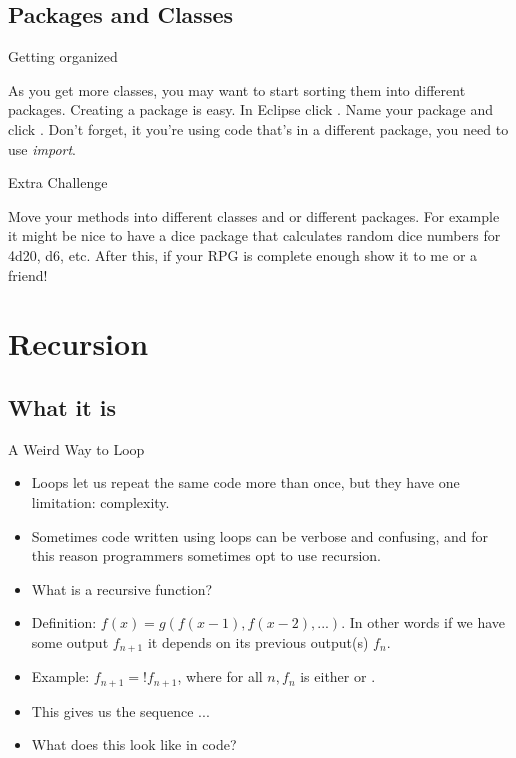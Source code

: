 \subsection{Packages and Classes}
\begin{frame}{Getting organized}
\begin{center}
As you get more classes, you may want to start sorting them into different packages. Creating a package is easy. In Eclipse click . Name your package and click . Don't forget, it you're using code that's in a different package, you need to use \emph{import}.
\end{center}
\end{frame}

\begin{frame}{Extra Challenge}
\begin{center}
Move your methods into different classes and or different packages. For example it might be nice to have a dice package that calculates random dice numbers for 4d20, d6, etc. After this, if your RPG is complete enough show it to me or a friend!
\end{center}
\end{frame}

\section{Recursion}

\subsection{What it is}
\begin{frame}{A Weird Way to Loop}
\begin{itemize}
\item Loops let us repeat the same code more than once, but they have one limitation: complexity. \pause
\item Sometimes code written using loops can be verbose and confusing, and for this reason programmers sometimes opt to use recursion.
\item What is a recursive function? \pause
\item Definition: $f(x) = g(f(x-1), f(x-2), ...)$. In other words if we have some output $f_{n+1}$ it depends on its previous output(s) $f_{n}$.\pause
\item Example: $f_{n+1} = !f_{n+1}$, where for all $n, f_n$ is either \texttt{} or \texttt{}. \pause
\item This gives us the sequence \texttt{}...
\item What does this look like in code?
\end{itemize}
\end{frame}

